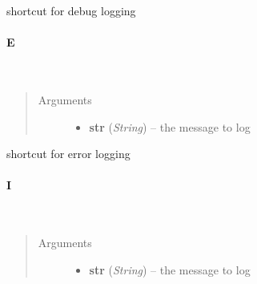 \documentclass[letterpaper,10pt,english]{sphinxmanual}
\begin{document}
shortcut for debug logging


\paragraph{E}
\label{ambrosia_web.util.Log:e}

\begin{fulllineitems}
\label{ambrosia_web.util.Log:ambrosia_web.util.Log.E}~\begin{quote}\begin{description}
\item[{Arguments}] \leavevmode\begin{itemize}
\item {} 
\textbf{str} (\emph{String}) -- the message to log

\end{itemize}

\end{description}\end{quote}

\end{fulllineitems}


shortcut for error logging


\paragraph{I}
\label{ambrosia_web.util.Log:i}

\begin{fulllineitems}
\label{ambrosia_web.util.Log:ambrosia_web.util.Log.I}~\begin{quote}\begin{description}
\item[{Arguments}] \leavevmode\begin{itemize}
\item {} 
\textbf{str} (\emph{String}) -- the message to log

\end{itemize}

\end{description}\end{quote}

\end{fulllineitems}
\end{document}
